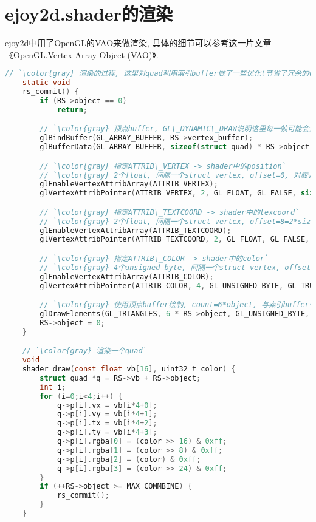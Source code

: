 \section {\ZHH ejoy2d.shader的渲染} {

    {ejoy2d中用了OpenGL的VAO来做渲染, 具体的细节可以参考这一片文章 \href{http://www.cppblog.com/init/archive/2012/02/21/166098.html}{《OpenGL.Vertex Array Object (VAO)》}. }\par

    \begin{lstlisting}[language=C]
    // `\color{gray} 渲染的过程, 这里对quad利用索引buffer做了一些优化(节省了冗余的vertex)`
    static void
    rs_commit() {
        if (RS->object == 0)
            return;

        // `\color{gray} 顶点buffer, GL\_DYNAMIC\_DRAW说明这里每一帧可能会渲染多次`
        glBindBuffer(GL_ARRAY_BUFFER, RS->vertex_buffer);
        glBufferData(GL_ARRAY_BUFFER, sizeof(struct quad) * RS->object, RS->vb, GL_DYNAMIC_DRAW);

        // `\color{gray} 指定ATTRIB\_VERTEX -> shader中的position`
        // `\color{gray} 2个float, 间隔一个struct vertex, offset=0, 对应vertex->vx, vertex->vy`
        glEnableVertexAttribArray(ATTRIB_VERTEX);
        glVertexAttribPointer(ATTRIB_VERTEX, 2, GL_FLOAT, GL_FALSE, sizeof(struct vertex), BUFFER_OFFSET(0));

        // `\color{gray} 指定ATTRIB\_TEXTCOORD -> shader中的texcoord`
        // `\color{gray} 2个float, 间隔一个struct vertex, offset=8=2*sizeof(GL\_FLOAT) 对应vertex->tx, vertex->ty`
        glEnableVertexAttribArray(ATTRIB_TEXTCOORD);
        glVertexAttribPointer(ATTRIB_TEXTCOORD, 2, GL_FLOAT, GL_FALSE, sizeof(struct vertex), BUFFER_OFFSET(8));

        // `\color{gray} 指定ATTRIB\_COLOR -> shader中的color`
        // `\color{gray} 4个unsigned byte, 间隔一个struct vertex, offset=16=4*sizeof(GL\_FLOAT) 对应vertex->rgba`
        glEnableVertexAttribArray(ATTRIB_COLOR);
        glVertexAttribPointer(ATTRIB_COLOR, 4, GL_UNSIGNED_BYTE, GL_TRUE, sizeof(struct vertex), BUFFER_OFFSET(16));

        // `\color{gray} 使用顶点buffer绘制, count=6*object, 与索引buffer一致`
        glDrawElements(GL_TRIANGLES, 6 * RS->object, GL_UNSIGNED_BYTE, 0);
        RS->object = 0;
    }

    // `\color{gray} 渲染一个quad`
    void
    shader_draw(const float vb[16], uint32_t color) {
        struct quad *q = RS->vb + RS->object;
        int i;
        for (i=0;i<4;i++) {
            q->p[i].vx = vb[i*4+0];
            q->p[i].vy = vb[i*4+1];
            q->p[i].tx = vb[i*4+2];
            q->p[i].ty = vb[i*4+3];
            q->p[i].rgba[0] = (color >> 16) & 0xff;
            q->p[i].rgba[1] = (color >> 8) & 0xff;
            q->p[i].rgba[2] = (color) & 0xff;
            q->p[i].rgba[3] = (color >> 24) & 0xff;
        }
        if (++RS->object >= MAX_COMMBINE) {
            rs_commit();
        }
    }



\end{lstlisting}}
